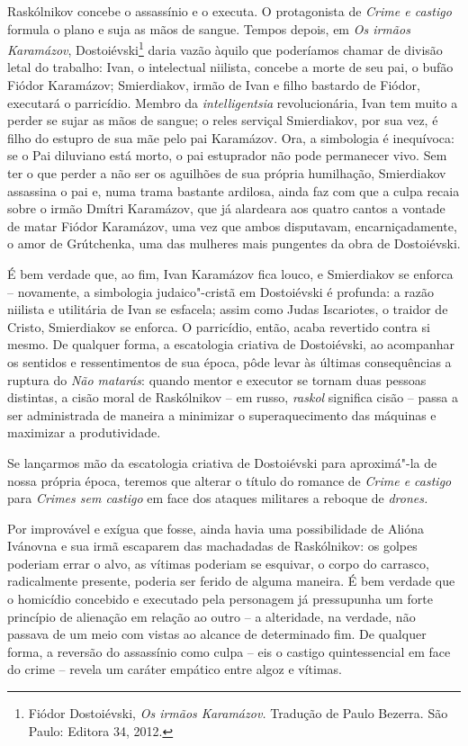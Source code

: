 Raskólnikov concebe o assassínio e o executa. O protagonista de
\emph{Crime e castigo} formula o plano e suja as mãos de sangue. Tempos
depois, em \emph{Os irmãos Karamázov}, Dostoiévski\footnote{Fiódor
  Dostoiévski, \emph{Os irmãos Karamázov.} Tradução de Paulo Bezerra.
  São Paulo: Editora 34, 2012.} daria vazão àquilo que poderíamos chamar
de divisão letal do trabalho: Ivan, o intelectual niilista, concebe a
morte de seu pai, o bufão Fiódor Karamázov; Smierdiakov, irmão de Ivan e
filho bastardo de Fiódor, executará o parricídio. Membro da
\emph{intelligentsia} revolucionária, Ivan tem muito a perder se sujar
as mãos de sangue; o reles serviçal Smierdiakov, por sua vez, é filho do
estupro de sua mãe pelo pai Karamázov. Ora, a simbologia é inequívoca:
se o Pai diluviano está morto, o pai estuprador não pode permanecer
vivo. Sem ter o que perder a não ser os aguilhões de sua própria
humilhação, Smierdiakov assassina o pai e, numa trama bastante ardilosa,
ainda faz com que a culpa recaia sobre o irmão Dmítri Karamázov, que já
alardeara aos quatro cantos a vontade de matar Fiódor Karamázov, uma vez
que ambos disputavam, encarniçadamente, o amor de Grútchenka, uma das
mulheres mais pungentes da obra de Dostoiévski.

É bem verdade que, ao fim, Ivan Karamázov fica louco, e Smierdiakov se
enforca -- novamente, a simbologia judaico"-cristã em Dostoiévski é
profunda: a razão niilista e utilitária de Ivan se esfacela; assim como
Judas Iscariotes, o traidor de Cristo, Smierdiakov se enforca. O
parricídio, então, acaba revertido contra si mesmo. De qualquer forma, a
escatologia criativa de Dostoiévski, ao acompanhar os sentidos e
ressentimentos de sua época, pôde levar às últimas consequências a
ruptura do \emph{Não matarás}: quando mentor e executor se tornam duas
pessoas distintas, a cisão moral de Raskólnikov -- em russo,
\emph{raskol} significa cisão -- passa a ser administrada de maneira a
minimizar o superaquecimento das máquinas e maximizar a produtividade.

Se lançarmos mão da escatologia criativa de Dostoiévski para aproximá"-la
de nossa própria época, teremos que alterar o título do romance de
\emph{Crime e castigo} para \emph{Crimes sem castigo} em face dos
ataques militares a reboque de \emph{drones. }

Por improvável e exígua que fosse, ainda havia uma possibilidade de
Alióna Ivánovna e sua irmã escaparem das machadadas de Raskólnikov: os
golpes poderiam errar o alvo, as vítimas poderiam se esquivar, o corpo
do carrasco, radicalmente presente, poderia ser ferido de alguma
maneira. É bem verdade que o homicídio concebido e executado pela
personagem já pressupunha um forte princípio de alienação em relação ao
outro -- a alteridade, na verdade, não passava de um meio com vistas ao
alcance de determinado fim. De qualquer forma, a reversão do assassínio
como culpa -- eis o castigo quintessencial em face do crime -- revela um
caráter empático entre algoz e vítimas.


